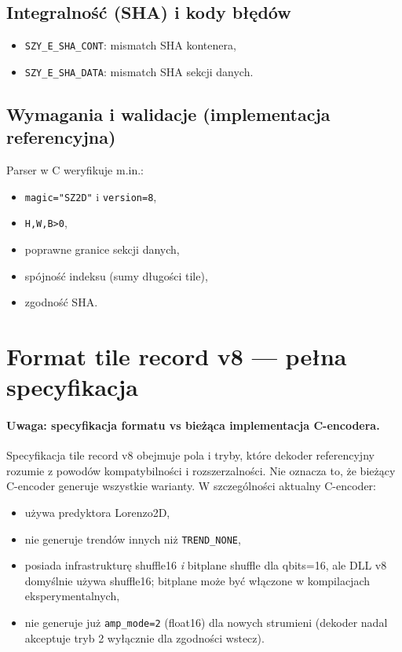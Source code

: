 \documentclass[11pt,a4paper]{article}
\begin{document}
\subsection{Integralność (SHA) i kody błędów}
\begin{itemize}
  \item \texttt{SZY\_E\_SHA\_CONT}: mismatch SHA kontenera,
  \item \texttt{SZY\_E\_SHA\_DATA}: mismatch SHA sekcji danych.
\end{itemize}

\subsection{Wymagania i walidacje (implementacja referencyjna)}
Parser w C weryfikuje m.in.:
\begin{itemize}
  \item \texttt{magic="SZ2D"} i \texttt{version=8},
  \item \texttt{H,W,B>0},
  \item poprawne granice sekcji danych,
  \item spójność indeksu (sumy długości tile),
  \item zgodność SHA.
\end{itemize}

\section{Format tile record v8 --- pełna specyfikacja}

\paragraph{Uwaga: specyfikacja formatu vs bieżąca implementacja C-encodera.}
Specyfikacja tile record v8 obejmuje pola i tryby, które dekoder referencyjny rozumie z powodów kompatybilności i rozszerzalności. Nie oznacza to, że bieżący C-encoder generuje wszystkie warianty. W szczególności aktualny C-encoder:
\begin{itemize}
  \item używa predyktora Lorenzo2D,
  \item nie generuje trendów innych niż \texttt{TREND\_NONE},
  \item posiada infrastrukturę shuffle16 \emph{i} bitplane shuffle dla qbits=16, ale DLL v8 domyślnie używa shuffle16; bitplane może być włączone w kompilacjach eksperymentalnych,
  \item nie generuje już \texttt{amp\_mode=2} (float16) dla nowych strumieni (dekoder nadal akceptuje tryb 2 wyłącznie dla zgodności wstecz).
\end{itemize}
\end{document}
